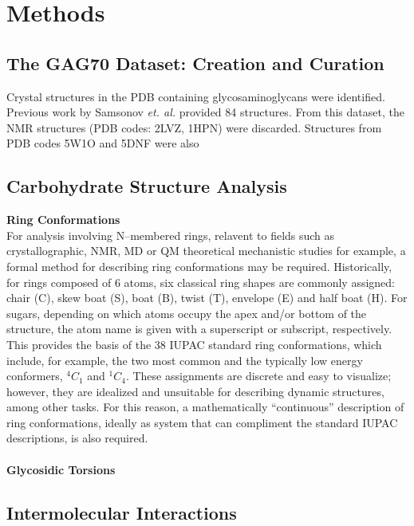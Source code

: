 \documentclass[a4paper, 12pt, openany]{book}
\begin{document}
\section{Methods}

\subsection{The GAG70 Dataset: Creation and Curation}
Crystal structures in the \ac{PDB} containing glycosaminoglycans were identified. 
Previous work by Samsonov \textit{et. al.} provided 84 structures.\autocite{Samsonov2016}
From this dataset, the NMR structures (\ac{PDB} codes: 2LVZ, 1HPN) were discarded.
Structures from \ac{PDB} codes 5W1O and 5DNF were also 

\subsection{Carbohydrate Structure Analysis}

\noindent \textbf{Ring Conformations}\\
For analysis involving N--membered rings, relavent to fields such as crystallographic, NMR, \ac{MD} or \ac{QM} theoretical mechanistic studies for example, a formal method for describing ring conformations may be required. Historically, for rings composed of 6 atoms, six classical ring shapes are commonly assigned: chair (C), skew boat (S), boat (B), twist (T), envelope (E) and half boat (H). For sugars, depending on which atoms occupy the apex and/or bottom of the structure, the atom name is given with a superscript or subscript, respectively. This provides the basis of the 38 IUPAC standard ring conformations, which include, for example, the two most common and the typically low energy conformers, $^{4}C_{1}$ and $^{1}C_{4}$. These assignments are discrete and easy to visualize; however, they are idealized and unsuitable for describing dynamic structures, among other tasks. For this reason, a mathematically ``continuous'' description of ring conformations, ideally as system that can compliment the standard IUPAC descriptions, is also required. 
\\
\\
\noindent \textbf{Glycosidic Torsions}\\

\subsection{Intermolecular Interactions}
\end{document}
